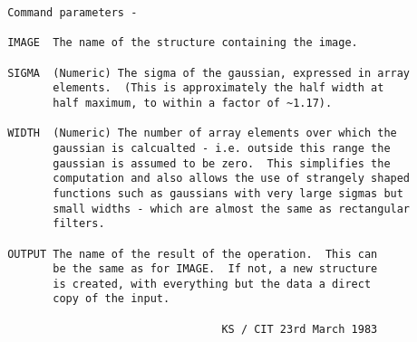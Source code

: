 \begin{description}
\begin{verbatim}
 Command parameters -

 IMAGE  The name of the structure containing the image.

 SIGMA  (Numeric) The sigma of the gaussian, expressed in array
        elements.  (This is approximately the half width at
        half maximum, to within a factor of ~1.17).

 WIDTH  (Numeric) The number of array elements over which the
        gaussian is calcualted - i.e. outside this range the
        gaussian is assumed to be zero.  This simplifies the
        computation and also allows the use of strangely shaped
        functions such as gaussians with very large sigmas but
        small widths - which are almost the same as rectangular
        filters.

 OUTPUT The name of the result of the operation.  This can
        be the same as for IMAGE.  If not, a new structure
        is created, with everything but the data a direct
        copy of the input.

                                  KS / CIT 23rd March 1983
\end{verbatim}
\end{description}
